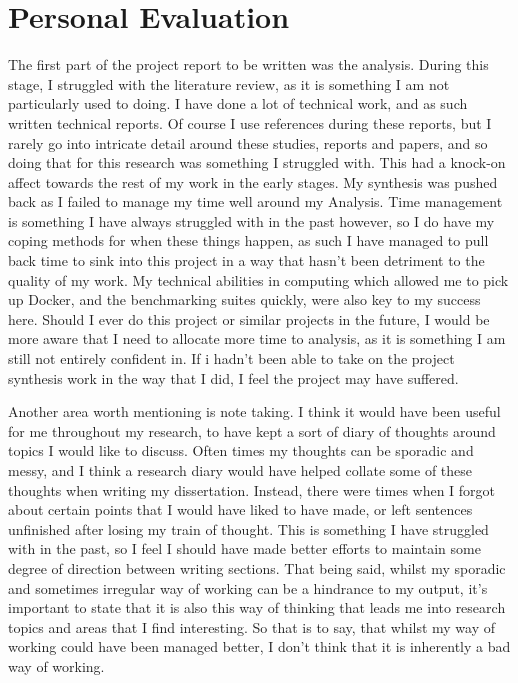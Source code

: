 \section{Personal Evaluation}%
The first part of the project report to be written was the analysis. During this stage, I struggled with the literature review, as it is something I am not particularly used to doing. I have done a lot of technical work, and as such written technical reports. Of course I use references during these reports, but I rarely go into intricate detail around these studies, reports and papers, and so doing that for this research was something I struggled with. This had a knock-on affect towards the rest of my work in the early stages. My synthesis was pushed back as I failed to manage my time well around my Analysis. Time management is something I have always struggled with in the past however, so I do have my coping methods for when these things happen, as such I have managed to pull back time to sink into this project in a way that hasn't been detriment to the quality of my work. My technical abilities in computing which allowed me to pick up Docker, and the benchmarking suites quickly, were also key to my success here. Should I ever do this project or similar projects in the future, I would be more aware that I need to allocate more time to analysis, as it is something I am still not entirely confident in. If i hadn't been able to take on the project synthesis work in the way that I did, I feel the project may have suffered.

Another area worth mentioning is note taking. I think it would have been useful for me throughout my research, to have kept a sort of diary of thoughts around topics I would like to discuss. Often times my thoughts can be sporadic and messy, and I think a research diary would have helped collate some of these thoughts when writing my dissertation. Instead, there were times when I forgot about certain points that I would have liked to have made, or left sentences unfinished after losing my train of thought. This is something I have struggled with in the past, so I feel I should have made better efforts to maintain some degree of direction between writing sections. That being said, whilst my sporadic and sometimes irregular way of working can be a hindrance to my output, it's important to state that it is also this way of thinking that leads me into research topics and areas that I find interesting. So that is to say, that whilst my way of working could have been managed better, I don't think that it is inherently a bad way of working.

